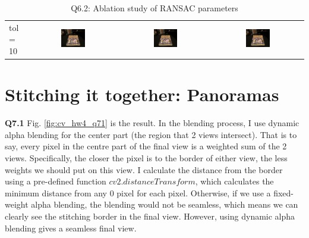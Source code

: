\documentclass[
  course = {{16-720B Computer Vision}},
  quartile = {{1}},
  assignment = 4\ -\ Feature\ Descriptors\ \&\ Homographies\ \& \  RANSAC,
  name = {{Kangle Deng}},
  email = {{kangled@andrew.cmu.edu}},
  firstexercise = 1
]{aga-homework}
\begin{document}
\begin{table}
\begin{center}
\begin{tabular}{lccc}
tol = 10 & \includegraphics[width=0.28\textwidth]{CV/fig/hw4/6_2_20.jpg} & \includegraphics[width=0.28\textwidth]{CV/fig/hw4/6_2_21.jpg}
& \includegraphics[width=0.28\textwidth]{CV/fig/hw4/6_2_22.jpg}\\
    \end{tabular}
  \end{center}
\caption{Q6.2: Ablation study of RANSAC parameters} 
  \label{tab:cv_hw4_q62}
\end{table}

\section{Stitching it together: Panoramas}

\noindent \textbf{Q7.1} Fig. \ref{fig:cv_hw4_q71} is the result. In the blending process, I use dynamic alpha blending for the center part (the region that 2 views intersect). That is to say, every pixel in the centre part of the final view is a weighted sum of the 2 views. Specifically, the closer the pixel is to the border of either view, the less weights we should put on this view. I calculate the distance from the border using a pre-defined function $cv2.distanceTransform$, which calculates the minimum distance from any 0 pixel for each pixel. Otherwise, if we use a fixed-weight alpha blending, the blending would not be seamless, which means we can clearly see the stitching border in the final view. However, using dynamic alpha blending gives a seamless final view.
\end{document}
